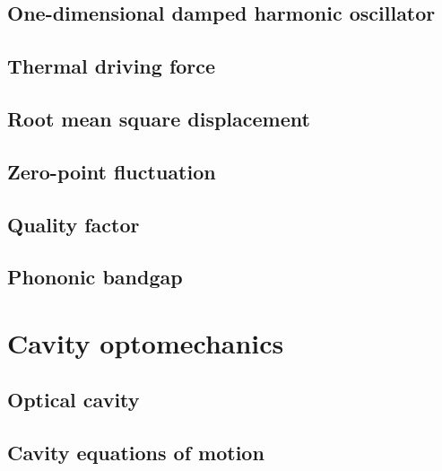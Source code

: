 \documentclass[12pt,twoside]{report}
\begin{document}
\subsection{One-dimensional damped harmonic oscillator} \label{sec:1D_ho}


\subsection{Thermal driving force}


\subsection{Root mean square displacement} \label{sec:xrms}


\subsection{Zero-point fluctuation}


\subsection{Quality factor}


\subsection{Phononic bandgap} \label{sec:bandgap}


\section{Cavity optomechanics}

\subsection{Optical cavity} \label{sec:opt_cav}


\subsection{Cavity equations of motion} \label{sec:cav_eom}

\end{document}
